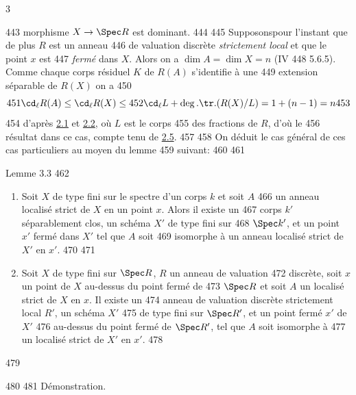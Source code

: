 3	\documentclass[10pt]{../fichiers-configuration-latex/smfart}
\begin{document}
   443	morphisme $X\rightarrow \Spec R$ est dominant.
   444	
   445	Supposons\pageoriginale pour l'instant que de plus $R$ est un anneau
   446	de valuation discrète \emph{strictement local} et que le point $x$ est
   447	\emph{fermé} dans $X$. Alors on a $\dim A=\dim X=n$ (\EGA IV
   448	5.6.5). Comme chaque corps résiduel $K$ de $R(A)$ s'identifie à une
   449	extension séparable de $R(X)$ on a
   450	$$
   451	\cd_{\ell}R(A)\leq \cd_{\ell}R(X)\leq
   452	\cd_{\ell}L+\deg.\tr.(R(X)/L)=1+(n-1)=n
   453	$$
   454	d'après \hyperref[X.thm2.1]{2.1} et \hyperref[X.thm2.2]{2.2}, où $L$ est le corps 
   455	des fractions de $R$, d'où le
   456	résultat dans ce cas, compte tenu de \hyperref[X.cor2.5]{2.5}.
   457	
   458	On déduit le cas général de ces cas particuliers au moyen du lemme
   459	suivant:
   460	
   461	\begin{enonce*}{Lemme 3.3}
   462	\begin{enumerate}
   463	\renewcommand{\theenumi}{\roman{enumi}}
   464	\renewcommand{\labelenumi}{(\theenumi)}
   465	\item Soit $X$ de type fini sur le spectre d'un corps $k$ et soit $A$
   466	  un anneau localisé strict de $X$ en un point $x$. Alors il existe un
   467	  corps $k'$ séparablement clos, un schéma $X'$ de type fini sur
   468	  $\Spec k'$, et un point $x'$ fermé dans $X'$ tel que $A$ soit
   469	  isomorphe à un anneau localisé strict de $X'$ en $x'$.
   470	
   471	\item Soit $X$ de type fini sur $\Spec R$, $R$ un anneau de valuation
   472	  discrète, soit $x$ un point de $X$ au-dessus du point fermé de
   473	  $\Spec R$ et soit $A$ un localisé strict de $X$ en $x$. Il existe un
   474	  anneau de valuation discrète strictement local $R'$, un schéma $X'$
   475	  de type fini sur $\Spec R'$, et un point fermé $x'$ de $X'$
   476	  au-dessus du point fermé de $\Spec R'$, tel que $A$ soit isomorphe à
   477	  un localisé strict de $X'$ en $x'$.
   478	\end{enumerate}
   479	\end{enonce*}
   480	
   481	Démonstration. 
\end{document}
